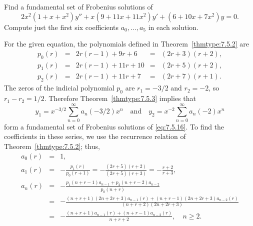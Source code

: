 \documentclass{ximera}
\begin{document}
\begin{example}\label{example:7.5.1}
Find a fundamental set of
Frobenius solutions of
\begin{equation} \label{eq:7.5.16}
2x^2(1+x+x^2)y''+x(9+11x+11x^2)y'+(6+10x+7x^2)y=0.
\end{equation}
Compute just the first six coefficients $a_0,\dots, a_5$ in each
solution.

\begin{explanation}
For  the given equation, the polynomials defined in
Theorem~\ref{thmtype:7.5.2} are
$$
\begin{array}{ccccc}
p_0(r)&=&2r(r-1)+9r+6&=&(2r+3)(r+2),\\
p_1(r)&=&2r(r-1)+11r+10&=&(2r+5)(r+2),\\ 
p_2(r)&=&2r(r-1)+11r+7&=&(2r+7)(r+1).
\end{array}
$$
The zeros of the indicial polynomial $p_0$ are $r_1=-3/2$
and $r_2=-2$, so  $r_1-r_2=1/2$. Therefore
Theorem~\ref{thmtype:7.5.3} implies that
\begin{equation} \label{eq:7.5.17}
y_1=x^{-3/2}\sum_{n=0}^\infty a_n(-3/2)x^n\quad\mbox{and}\quad
y_2=x^{-2}\sum_{n=0}^\infty a_n(-2)x^n
\end{equation}
form a fundamental set of Frobenius solutions of \eqref{eq:7.5.16}.
To find the coefficients in these series, we use the recurrence
relation of Theorem~\ref{thmtype:7.5.2};   thus,
\begin{eqnarray*}
a_0(r)&=&1,\\
a_1(r)&=&-\frac{p_1(r)}{p_0(r+1)}
=-\frac{(2r+5)(r+2)}{(2r+5)(r+3)}
=-\frac{r+2}{r+3},\\
a_n(r)&=&-\frac{p_1(n+r-1)a_{n-1}+p_2(n+r-2)a_{n-2}}{p_0(n+r)}\\
&=&-\frac{(n+r+1)(2n+2r+3)a_{n-1}(r)
+(n+r-1)(2n+2r+3)a_{n-2}(r)}{(n+r+2)(2n+2r+3)}\\
&=&-\frac{(n+r+1)a_{n-1}(r)+(n+r-1)a_{n-2}(r)}{n+r+2},\quad n\geq2.
\end{eqnarray*}


\end{explanation}
\end{example}
\end{document}

